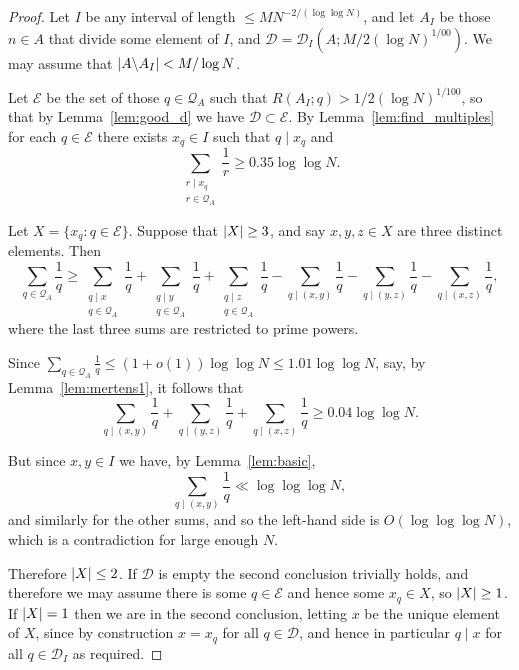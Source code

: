 \begin{proof}
Let $I$ be any interval of length $\leq MN^{-2/(\log\log N)}$, and let $A_I$ be those $n\in A$ that divide some element of $I$, and $\mathcal{D}=\mathcal{D}_I(A;M/2(\log N)^{1/00})$. We may assume that $\left\lvert A\backslash A_I\right\rvert< M/\log N$.

Let $\mathcal{E}$ be the set of those $q\in\mathcal{Q}_A$ such that $R(A_I;q)> 1/2(\log N)^{1/100}$, so that by Lemma~\ref{lem:good_d} we have $\mathcal{D}\subset \mathcal{E}$. By Lemma~\ref{lem:find_multiples} for each $q\in\mathcal{E}$ there exists $x_q\in I$ such that $q\mid x_q$ and
\[\sum_{\substack{r\mid x_q\\ r\in \mathcal{Q}_A}}\frac{1}{r}\geq 0.35\log\log N.\]


Let $X=\{x_q : q\in \mathcal{E}\}$. Suppose that $\left\lvert X\right\rvert\geq 3$, and say $x,y,z\in X$ are three distinct elements. Then
\[\sum_{q\in\mathcal{Q}_A}\frac{1}{q}\geq \sum_{\substack{q\mid x\\ q\in \mathcal{Q}_A}}\frac{1}{q}+\sum_{\substack{q\mid y\\ q\in \mathcal{Q}_A}}\frac{1}{q}+\sum_{\substack{q\mid z\\ q\in \mathcal{Q}_A}}\frac{1}{q}-\sum_{q\mid (x,y)}\frac{1}{q}-\sum_{q\mid (y,z)}\frac{1}{q}-\sum_{q\mid (x,z)}\frac{1}{q},\]
where the last three sums are restricted to prime powers. 

Since $\sum_{q\in\mathcal{Q}_A}\frac{1}{q}\leq (1+o(1))\log\log N\leq 1.01\log\log N$, say, by Lemma~\ref{lem:mertens1}, it follows that 
\[\sum_{q\mid (x,y)}\frac{1}{q}+\sum_{q\mid (y,z)}\frac{1}{q}+\sum_{q\mid (x,z)}\frac{1}{q}\geq 0.04\log\log N.\]

But since $x,y\in I$ we have, by Lemma~\ref{lem:basic},
  \[\sum_{q\mid (x,y)}\frac{1}{q}\ll \log\log\log N,\]
and similarly for the other sums, and so the left-hand side is $O(\log\log\log N)$, which is a contradiction for large enough $N$.

Therefore $\left\lvert X\right\rvert\leq 2$. If $\mathcal{D}$ is empty the second conclusion trivially holds, and therefore we may assume there is some $q\in \mathcal{E}$ and hence some $x_q\in X$, so $\left\lvert X\right\rvert\geq 1$. If $\left\lvert X\right\rvert=1$ then we are in the second conclusion, letting $x$ be the unique element of $X$, since by construction $x=x_q$ for all $q\in \mathcal{D}$, and hence in particular $q\mid x$ for all $q\in \mathcal{D}_I$ as required. 


\end{proof}
